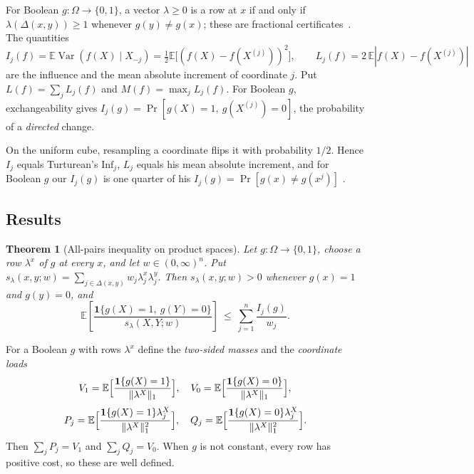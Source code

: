 \documentclass[11pt]{article}
\numberwithin{equation}{section}
\newtheorem{theorem}{Theorem}[section]
\theoremstyle{definition}
\theoremstyle{remark}
\newcommand{\E}{\mathbb{E}}
\newcommand{\1}{\mathbf 1}
\newcommand{\Var}{\operatorname{Var}}
\newcommand{\nrm}[1]{\lVert #1\rVert_1}
\begin{document}
For Boolean $g:\Omega\to\{0,1\}$, a vector $\lambda\ge0$ is a row at $x$ if and only if $\lambda(\Delta(x,y))\ge1$ whenever $g(y)\ne g(x)$; these are fractional certificates~\cite{Tal13,GSS16,KT16}. The quantities
\[
I_j(f)=\E\Var(f(X)\mid X_{-j})=\tfrac12\E\bigl[(f(X)-f(X^{(j)}))^2\bigr],\qquad L_j(f)=2\,\E|f(X)-f(X^{(j)})|
\]
are the influence and the mean absolute increment of coordinate $j$. Put $L(f)=\sum_jL_j(f)$ and $M(f)=\max_jL_j(f)$. For Boolean $g$, exchangeability gives $I_j(g)=\Pr[g(X)=1,\ g(X^{(j)})=0]$, the probability of a \emph{directed} change.

On the uniform cube, resampling a coordinate flips it with probability $1/2$. Hence $I_j$ equals Turturean's $\mathrm{Inf}_j$, $L_j$ equals his mean absolute increment, and for Boolean $g$ our $I_j(g)$ is one quarter of his $I_j(g)=\Pr[g(x)\neq g(x^j)]$ \cite[Section~2]{Tur26}.

\subsection{Results}

\begin{theorem}[All-pairs inequality on product spaces]\label{thm:allpairs}
Let $g:\Omega\to\{0,1\}$, choose a row $\lambda^x$ of $g$ at every $x$, and let $w\in(0,\infty)^n$. Put $s_\lambda(x,y;w)=\sum_{j\in\Delta(x,y)}w_j\lambda^x_j\lambda^y_j$. Then $s_\lambda(x,y;w)>0$ whenever $g(x)=1$ and $g(y)=0$, and
\begin{equation}\label{eq:allpairs}
\E\left[\frac{\1\{g(X)=1,\ g(Y)=0\}}{s_\lambda(X,Y;w)}\right]\ \le\ \sum_{j=1}^n\frac{I_j(g)}{w_j}.
\end{equation}
\end{theorem}

For a Boolean $g$ with rows $\lambda^x$ define the \emph{two-sided masses} and the \emph{coordinate loads}
\[
V_1=\E\Bigl[\frac{\1\{g(X)=1\}}{\nrm{\lambda^X}}\Bigr],\quad V_0=\E\Bigl[\frac{\1\{g(X)=0\}}{\nrm{\lambda^X}}\Bigr],\]\[
P_j=\E\Bigl[\frac{\1\{g(X)=1\}\lambda^X_j}{\nrm{\lambda^X}^2}\Bigr],\quad Q_j=\E\Bigl[\frac{\1\{g(X)=0\}\lambda^X_j}{\nrm{\lambda^X}^2}\Bigr].
\]
Then $\sum_jP_j=V_1$ and $\sum_jQ_j=V_0$. When $g$ is not constant, every row has positive cost, so these are well defined.
\end{document}
